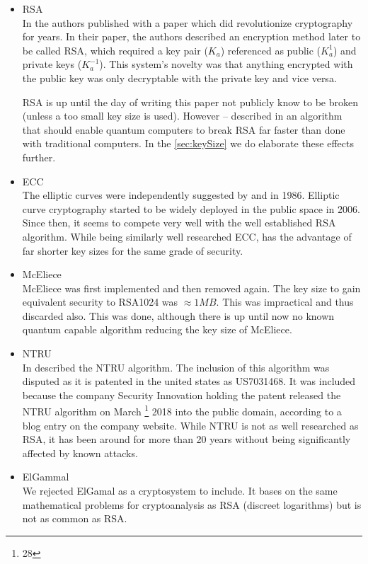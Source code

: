\begin{itemize}
	\item RSA\\
	In \citeyear{Rivest:1978:MOD:359340.359342} the authors \citeauthor{Rivest:1978:MOD:359340.359342} published with \cite{Rivest:1978:MOD:359340.359342} a paper which did revolutionize cryptography for years. In their paper, the authors described an encryption method later to be called RSA, which required a key pair ($K_a$) referenced as public ($K^{1}_a$) and private keys ($K^{-1}_a$). This system's novelty was that anything encrypted with the public key was only decryptable with the private key and vice versa.
	
	RSA is up until the day of writing this paper not publicly know to be broken (unless a too small key size is used). However -- \citeauthor{Shor97polynomial-timealgorithms} described in \citeyear{Shor97polynomial-timealgorithms} an algorithm that should enable quantum computers to break RSA far faster than done with traditional computers. In the \cref{sec:keySize} we do elaborate these effects further.
	\item ECC\\
	The elliptic curves were independently suggested by \cite{Miller1986} and \cite{Koblitz04guideto} in 1986. Elliptic curve cryptography started to be widely deployed in the public space in 2006. Since then, it seems to compete very well with the well established RSA algorithm. While being similarly well researched ECC, has the advantage of far shorter key sizes for the same grade of security.
	\item McEliece\\
	McEliece was first implemented and then removed again. The key size to gain equivalent security to RSA1024 was $\approx 1MB$. This was impractical and thus discarded also. This was done, although there is up until now no known quantum capable algorithm reducing the key size of McEliece.
	\item NTRU\\
	In \cite{Hoffstein1998} \citeauthor{Hoffstein1998} described the NTRU algorithm. The inclusion of this algorithm was disputed as it is patented in the united states as US7031468. It was included because the company Security Innovation holding the patent released the NTRU algorithm on March \thanks{28} 2018 into the public domain, according to a blog entry on the company website. While NTRU is not as well researched as RSA, it has been around for more than 20 years without being significantly affected by known attacks.
	\item ElGammal\\
	We rejected ElGamal as a cryptosystem to include. It bases on the same mathematical problems for cryptoanalysis as RSA (discreet logarithms) but is not as common as RSA.
\end{itemize}


